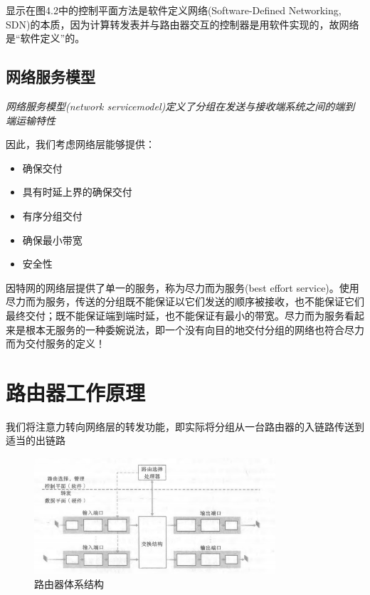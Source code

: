     显示在图4.2中的控制平面方法是软件定义网络(Software-Defined Networking, SDN)的本质，因为计算转发表并与路由器交互的控制器是用软件实现的，故网络是“软件定义”的。

\subsection{网络服务模型}

    \emph{网络服务模型(network servicemodel)定义了分组在发送与接收端系统之间的端到端运输特性}

    因此，我们考虑网络层能够提供：

\begin{itemize}
    \item 确保交付
    \item 具有时延上界的确保交付
    \item 有序分组交付
    \item 确保最小带宽
    \item 安全性
\end{itemize}

    因特网的网络层提供了单一的服务，称为尽力而为服务(best effort service)。使用尽力而为服务，传送的分组既不能保证以它们发送的顺序被接收，也不能保证它们最终交付；既不能保证端到端时延，也不能保证有最小的带宽。尽力而为服务看起来是根本无服务的一种委婉说法，即一个没有向目的地交付分组的网络也符合尽力而为交付服务的定义！

\section{路由器工作原理}

    我们将注意力转向网络层的转发功能，即实际将分组从一台路由器的入链路传送到适当的出链路

\begin{figure}[!htbp]
    \centering
    \includegraphics[width=0.8\textwidth]{image/chapter04/路由器体系结构.png}
    \caption{路由器体系结构}
\end{figure}    

